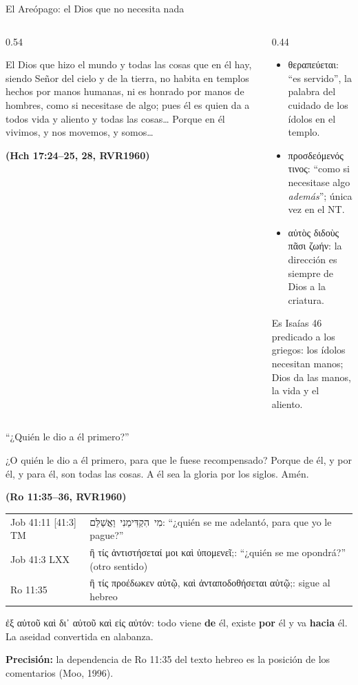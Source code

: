 \documentclass[hyperref={bookmarks=false},aspectratio=169]{beamer}
\newcommand{\heb}[1]{\mbox{\foreignlanguage{hebrew}{#1}}}
\newcommand{\grc}[1]{\foreignlanguage{ancientgreek}{#1}}
\newcommand{\fuente}[1]{\par\hfill{\upshape\bfseries\footnotesize\textcolor{azul}{#1}}}
\newcommand{\destacar}[1]{\textbf{\textcolor{azul}{#1}}}
\newcommand{\precision}[1]{{\footnotesize\color{gris}\textbf{Precisión:} #1}}
\begin{document}
\begin{frame}{El Areópago: el Dios que no necesita nada}
\begin{columns}[t,onlytextwidth]
\begin{column}{0.54\textwidth}
\begin{cita}El Dios que hizo el mundo y todas las cosas que en él hay, siendo Señor del cielo y de la tierra, no habita en templos hechos por manos humanas, ni es honrado por manos de hombres, como si necesitase de algo; pues él es quien da a todos vida y aliento y todas las cosas\ldots{} Porque en él vivimos, y nos movemos, y somos\ldots\fuente{(Hch 17:24--25, 28, RVR1960)}\end{cita}
\end{column}
\begin{column}{0.44\textwidth}\scriptsize
\begin{itemize}
\item \grc{θεραπεύεται}: ``es servido'', la palabra del cuidado de los ídolos en el templo.
\item \grc{προσδεόμενός τινος}: ``como si necesitase algo \emph{además}''; única vez en el NT.
\item \grc{αὐτὸς διδοὺς πᾶσι ζωήν}: la dirección es siempre de Dios a la criatura.
\end{itemize}
\small Es Isaías 46 predicado a los griegos: los ídolos necesitan manos; Dios da las manos, la vida y el aliento.
\end{column}
\end{columns}
\end{frame}

\begin{frame}{``¿Quién le dio a él primero?''}
\begin{cita}¿O quién le dio a él primero, para que le fuese recompensado? Porque de él, y por él, y para él, son todas las cosas. A él sea la gloria por los siglos. Amén.\fuente{(Ro 11:35--36, RVR1960)}\end{cita}
\scriptsize\renewcommand{\arraystretch}{1.15}
\begin{tabular}{@{}>{\RaggedRight\arraybackslash}p{2.4cm}>{\RaggedRight\arraybackslash}p{9.4cm}@{}}
\toprule
Job 41:11 [41:3] TM & \heb{מִי הִקְדִּימַנִי וַאֲשַׁלֵּם}: ``¿quién se me adelantó, para que yo le pague?'' \\
Job 41:3 LXX & \grc{ἢ τίς ἀντιστήσεταί μοι καὶ ὑπομενεῖ;}: ``¿quién se me opondrá?'' (otro sentido) \\
Ro 11:35 & \grc{ἢ τίς προέδωκεν αὐτῷ, καὶ ἀνταποδοθήσεται αὐτῷ;}: sigue al hebreo \\
\bottomrule
\end{tabular}\par\medskip
\small \grc{ἐξ αὐτοῦ καὶ δι᾽ αὐτοῦ καὶ εἰς αὐτόν}: todo viene \destacar{de} él, existe \destacar{por} él y va \destacar{hacia} él. La aseidad convertida en alabanza.\par
\precision{la dependencia de Ro 11:35 del texto hebreo es la posición de los comentarios (Moo, 1996).}
\end{frame}
\end{document}
